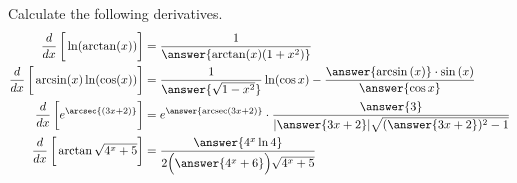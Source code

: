 \documentclass{ximera}
\author{Nela Lakos}
\begin{document}
\begin{exercise}

Calculate the following derivatives.
\begin{align*}
\frac{d}{dx}\left[\vphantom{\frac{d}{dx}}\ln(\arctan(x))\right] &= \frac{1}{\answer{\arctan(x)(1+x^2)}}\\
\frac{d}{dx}\left[\vphantom{\frac{d}{dx}}\arcsin(x)\ln(\cos(x))\right] &=\dfrac{1}{ \answer{\sqrt{1-x^2}}}\ln(\cos{x}) - \dfrac{\answer{\arcsin{(x)}}\cdot\sin{(x)}}{\answer{\cos{x}}}\\
\frac{d}{dx}\left[\vphantom{\frac{d}{dx}}e^{\arcsec{\left(3x+2\right)}}\right] &=e^{ \answer{\text{arcsec}{\left(3x+2\right)}}}\cdot\dfrac{\answer{3}}{|\answer{3x+2}|\sqrt{(\answer{3x+2})^2-1}}\\
\frac{d}{dx}\left[\vphantom{\frac{d}{dx}}\arctan{\sqrt{4^x +5}}\right] &=\dfrac{\answer{4^{x}\ln{4}}}{2\Bigl(\answer{4^{x}+6}\Bigr)\sqrt{4^{x}+5}}
\end{align*}
\end{exercise}
\end{document}
